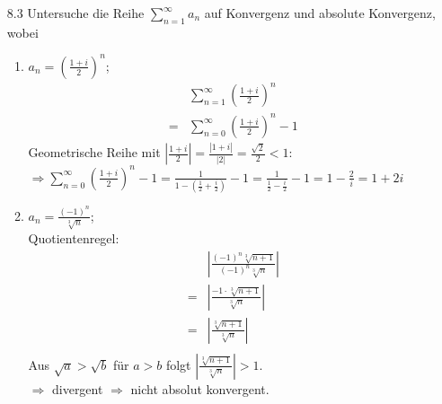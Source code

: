 \documentclass{HM}
\begin{document}
\begin{enumerate}
\item[8.3] Untersuche die Reihe $\sum\limits_{n=1}^\infty a_n$ auf Konvergenz und absolute Konvergenz, wobei\\
\begin{enumerate}

\item $a_n=\left(\frac{1+i}{2}\right)^n$;
\begin{align*}
 &\sum\limits_{n=1}^\infty\left(\frac{1+i}{2}\right)^n\\
=&\sum\limits_{n=0}^\infty\left(\frac{1+i}{2}\right)^n-1
\end{align*}
Geometrische Reihe mit $|\frac{1+i}{2}| = \frac{|1+i|}{|2|} = \frac{\sqrt{2}}{2} < 1$:\\
$\Rightarrow 
 \sum\limits_{n=0}^\infty\left(\frac{1+i}{2}\right)^n-1
=\frac{1}{1-(\frac{1}{2}+\frac{i}{2})}-1
=\frac{1}{\frac{1}{2}-\frac{i}{2}}-1
=1-\frac{2}{i}
=1+2i$\\

\item $a_n=\frac{(-1)^n}{\sqrt[3]{n}}$;\\
Quotientenregel:
\begin{align*}
	&\left|\frac{(-1)^n\sqrt[3]{n+1}}{(-1)^n\sqrt[3]{n}}\right|\\
	=&\left|\frac{-1\cdot\sqrt[3]{n+1}}{\sqrt[3]{n}}\right|\\
	=&\left|\frac{\sqrt[3]{n+1}}{\sqrt[3]{n}}\right|\\
\end{align*}
Aus $\sqrt{a}>\sqrt{b}$ für $a>b$ folgt $\left|\frac{\sqrt[3]{n+1}}{\sqrt[3]{n}}\right|>1$.\\
$\Rightarrow$ divergent $\Rightarrow$ nicht absolut konvergent.


\end{enumerate}
\end{enumerate}
\end{document}
